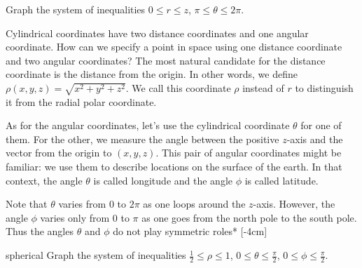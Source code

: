 \documentclass{watsonbook}
\begin{document}
\begin{exercise}{}{}
  Graph the system of inequalities $0 \leq r \leq z$, \: $\pi \leq \theta
  \leq 2\pi$. 
\end{exercise}

Cylindrical coordinates have two distance coordinates and one angular
coordinate. How can we specify a point in space using one distance
coordinate and two angular coordinates? The most natural candidate for
the distance coordinate is the distance from the origin. In other
words, we define $\rho(x,y,z) = \sqrt{x^2 + y^2 + z^2}$. We call this coordinate
$\rho$ instead of $r$ to distinguish it from the radial polar coordinate.

As for the angular coordinates, let's use the cylindrical coordinate
$\theta$ for one of them. For the other, we measure the angle between
the positive $z$-axis and the vector from the origin to
$(x,y,z)$. This pair of angular coordinates might be familiar: we use
them to describe locations on the surface of the earth. In that
context, the angle $\theta$ is called longitude and the angle $\phi$
is called latitude.

Note that $\theta$ varies from 0 to $2\pi$ as one loops around the
$z$-axis. However, the angle $\phi$ varies only from 0 to $\pi$ as one
goes from the north pole to the south pole. Thus the angles $\theta$
and $\phi$ do not play symmetric roles* [-4cm]

\begin{example}{}{spherical}
  Graph the system of inequalities $\tfrac{1}{2} \leq \rho \leq 1$, \: $0
  \leq \theta \leq \tfrac{\pi}{2}$, \: $0 \leq \phi \leq \tfrac{\pi}{2}$. 
\end{example}
\end{document}
